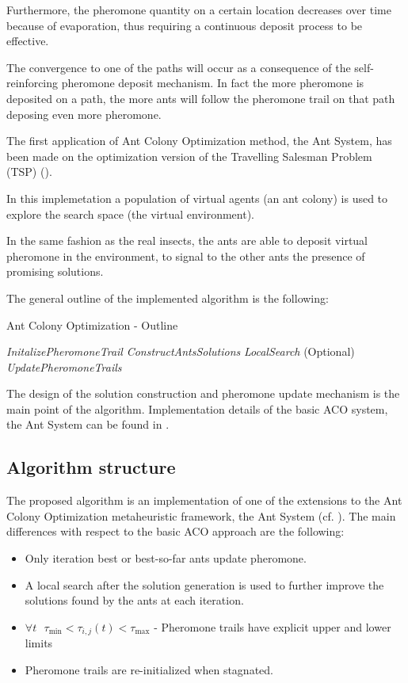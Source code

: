 \begin{homeworkProblem}
Furthermore, the pheromone quantity on a certain location decreases over time because of evaporation, thus requiring a continuous deposit process to be effective.

The convergence to one of the paths will occur as a consequence of the self-reinforcing pheromone deposit mechanism.
In fact the more pheromone is deposited on a path, the more ants will follow the pheromone trail on that path deposing even more pheromone.

The first application of Ant Colony Optimization method, the Ant System, has been made on the optimization version of the Travelling Salesman Problem (TSP) (\cite{dorigo1996ant}).

In this implemetation a population of virtual agents (an ant colony) is used to explore the search space (the virtual environment).

In the same fashion as the real insects, the ants are able to deposit virtual pheromone in the environment, to signal to the other ants the presence of promising solutions.

The general outline of the implemented algorithm is the following: 

\begin{algorithm}[!h]
  \caption{Ant Colony Optimization - Outline}\label{aco}
  \begin{algorithmic}[1]
    \State \emph{InitalizePheromoneTrail} 
        \State \emph{ConstructAntsSolutions}
        \State \emph{LocalSearch} (Optional)
        \State \emph{UpdatePheromoneTrails}
    \EndWhile
\end{algorithmic}
\end{algorithm}

The design of the solution construction and pheromone update mechanism is the main point of the algorithm.
Implementation details of the basic ACO system, the Ant System can be found in \cite{dorigo2006artificial}.

\subsection{Algorithm structure} \label{sec:algstruc}
The proposed algorithm is an implementation of one of the extensions to the Ant Colony Optimization metaheuristic framework, the \maxmin Ant System (cf. \cite{stutzle2000max}).
The main differences with respect to the basic ACO approach are the following:
\begin{itemize}
  \item Only iteration best or best-so-far ants update pheromone.
  \item A local search after the solution generation is used to further improve the solutions found by the ants at each iteration.
  \item $\forall t \text{ } \tau_{\min} < \tau_{i,j}(t) < \tau_{\max}  $ - Pheromone trails have explicit upper and lower limits
  \item Pheromone trails are re-initialized when stagnated.
\end{itemize}


\end{homeworkProblem}
